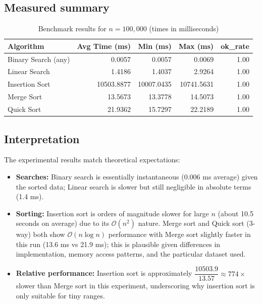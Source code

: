 \documentclass[11pt,a4paper]{article}
\begin{document}
\subsection{Measured summary}
\begin{table}[H]
\centering
\caption{Benchmark results for $n=100{,}000$ (times in milliseconds)}
\begin{tabular}{lrrrr}
\toprule
\textbf{Algorithm} & \textbf{Avg Time (ms)} & \textbf{Min (ms)} & \textbf{Max (ms)} & \textbf{ok\_rate} \\
\midrule
Binary Search (any) & 0.0057 & 0.0057 & 0.0069 & 1.00 \\
Linear Search       & 1.4186 & 1.4037 & 2.9264 & 1.00 \\
Insertion Sort      & 10503.8877 & 10007.0435 & 10741.5631 & 1.00 \\
Merge Sort          & 13.5673 & 13.3778 & 14.5073 & 1.00 \\
Quick Sort          & 21.9362 & 15.7297 & 22.2189 & 1.00 \\
\bottomrule
\end{tabular}
\end{table}

\subsection{Interpretation}
The experimental results match theoretical expectations:
\begin{itemize}
  \item \textbf{Searches:} Binary search is essentially instantaneous (0.006 ms average) given the sorted data; Linear search is slower but still negligible in absolute terms (1.4 ms).
  \item \textbf{Sorting:} Insertion sort is orders of magnitude slower for large $n$ (about 10.5 seconds on average) due to its $\mathcal{O}(n^2)$ nature. Merge sort and Quick sort (3-way) both show $\mathcal{O}(n\log n)$ performance with Merge sort slightly faster in this run (13.6 ms vs 21.9 ms); this is plausible given differences in implementation, memory access patterns, and the particular dataset used.
  \item \textbf{Relative performance:} Insertion sort is approximately $\dfrac{10503.9}{13.57}\approx 774\times$ slower than Merge sort in this experiment, underscoring why insertion sort is only suitable for tiny ranges.
\end{itemize}
\end{document}
